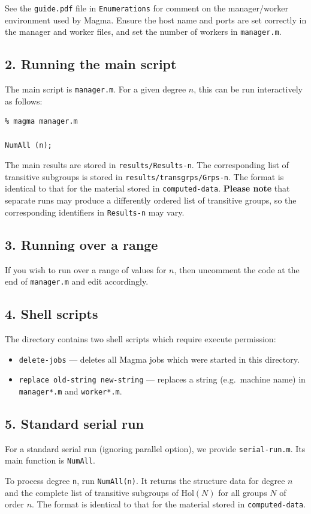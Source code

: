 \documentclass{article}
\begin{document}
See the \texttt{guide.pdf} file in \texttt{Enumerations} for comment on the manager/worker environment used by Magma. Ensure the host name and ports are set correctly in the manager and worker files, and set the number of workers in \texttt{manager.m}.

\subsection*{2. Running the main script}

The main script is \texttt{manager.m}. For a given degree $n$, this can be run interactively as follows:

\begin{verbatim}
% magma manager.m

NumAll (n);
\end{verbatim}

The main results are stored in \texttt{results/Results-n}. The corresponding list of transitive subgroups is stored in \texttt{results/transgrps/Grps-n}.
The format is identical to that for the material stored in {\tt computed-data}. \textbf{Please note} that separate runs may produce a differently ordered list of transitive groups, so the corresponding identifiers in {\tt Results-n} may vary.

\subsection*{3. Running over a range}

If you wish to run over a range of values for $n$, then uncomment the code at the end of \texttt{manager.m} and edit accordingly.

\subsection*{4. Shell scripts}

The directory contains two shell scripts which require execute permission:

\begin{itemize}
    \item \texttt{delete-jobs} --- deletes all Magma jobs which were started in this directory.

    \item \texttt{replace old-string new-string} --- replaces a string (e.g.\ machine name) in \texttt{manager*.m} and \texttt{worker*.m}.
\end{itemize}

\subsection*{5. Standard serial run}

For a standard serial run (ignoring parallel option), we provide 
{\tt serial-run.m}. Its main function is {\tt NumAll}.

To process degree {\tt n}, run {\tt NumAll(n)}. It returns
the structure data for degree $n$ and the complete list 
of transitive subgroups of $\mathrm{Hol}(N)$ for all groups $N$ of order $n$.
The format is identical to that for the material stored in {\tt computed-data}.
\end{document}
